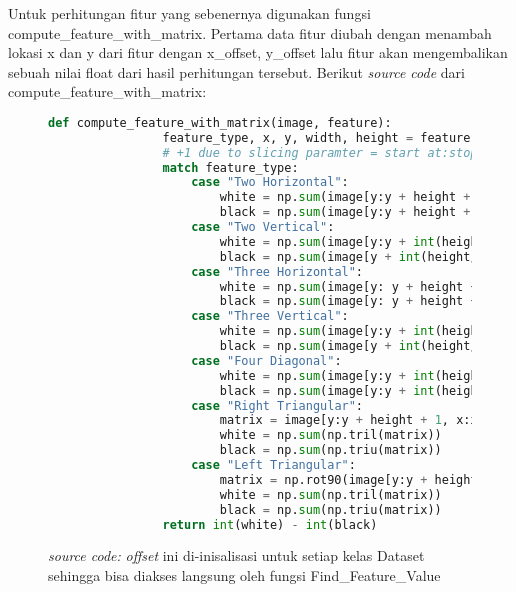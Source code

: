 	Untuk perhitungan fitur yang sebenernya digunakan fungsi compute\_feature\_with\_matrix. 
	Pertama data fitur diubah dengan menambah lokasi x dan y dari fitur dengan x\_offset, y\_offset 
	lalu fitur akan mengembalikan sebuah nilai float dari hasil perhitungan tersebut. Berikut \emph{source code} 
	dari compute\_feature\_with\_matrix:
	
	\begin{figure}[H]
		\begin{lstlisting}[language=Python, basicstyle=\tiny]
			def compute_feature_with_matrix(image, feature):
				feature_type, x, y, width, height = feature
				# +1 due to slicing paramter = start at:stop before
				match feature_type:
					case "Two Horizontal":
						white = np.sum(image[y:y + height + 1, x:x + int(width/2) + 1])
						black = np.sum(image[y:y + height + 1, x + int(width/2):x + width + 1])
					case "Two Vertical":
						white = np.sum(image[y:y + int(height/2) + 1, x:x + width+1])
						black = np.sum(image[y + int(height/2):y + height + 1, x:x + width+1])
					case "Three Horizontal":
						white = np.sum(image[y: y + height + 1, x:x + int(width/3) + 1]) + np.sum(image[y: y + height + 1, x + int(width*2/3):x + width + 1])
						black = np.sum(image[y: y + height + 1, x + int(width/3):x + int(width*2/3) + 1])
					case "Three Vertical":
						white = np.sum(image[y:y + int(height/3) + 1, x:x + width + 1]) + np.sum(image[y + int(height*2/3):y + height + 1, x: x + width + 1])
						black = np.sum(image[y + int(height/3):y + int(height*2/3) + 1, x:x + width + 1])
					case "Four Diagonal":
						white = np.sum(image[y:y + int(height/2) + 1, x + int(width/2): x + width + 1]) + np.sum(image[y + int(height/2):y + height + 1, x: x + int(width/2) + 1])
						black = np.sum(image[y:y + int(height/2) + 1, x:x + int(width/2) + 1]) + np.sum(image[y + int(height/2): y + height + 1, x + int(width/2):x + width + 1])
					case "Right Triangular":
						matrix = image[y:y + height + 1, x:x + width + 1]
						white = np.sum(np.tril(matrix))
						black = np.sum(np.triu(matrix))
					case "Left Triangular":
						matrix = np.rot90(image[y:y + height + 1, x:x + width + 1], k=3)
						white = np.sum(np.tril(matrix))
						black = np.sum(np.triu(matrix))
				return int(white) - int(black)
		\end{lstlisting}
		\caption{\emph{source code:} \textit{offset} ini di-inisalisasi untuk setiap kelas Dataset 
		sehingga bisa diakses langsung oleh fungsi Find\_Feature\_Value}
		\label{code: feature calculation}
	\end{figure}

